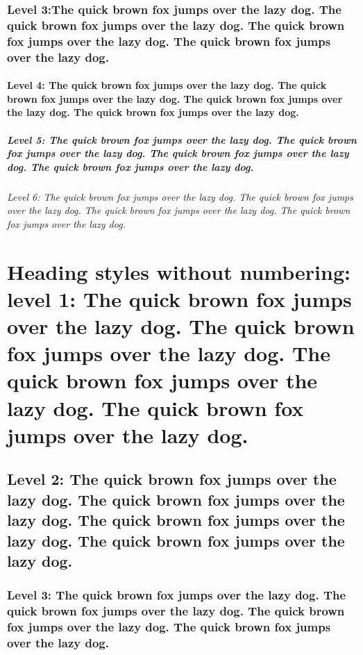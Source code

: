 \documentclass[9pt, twoside]{extreport}
\begin{document}
\lipsum[3-4]

\subsection{Level 3:The quick brown fox jumps over the lazy dog. The quick brown fox jumps over the lazy dog. The quick brown fox jumps over the lazy dog. The quick brown fox jumps over the lazy dog.}

\lipsum[5-6]

\subsubsection{Level 4: The quick brown fox jumps over the lazy dog. The quick brown fox jumps over the lazy dog. The quick brown fox jumps over the lazy dog. The quick brown fox jumps over the lazy dog.}

\lipsum[7-8]

\paragraph{Level 5: The quick brown fox jumps over the lazy dog. The quick brown fox jumps over the lazy dog. The quick brown fox jumps over the lazy dog. The quick brown fox jumps over the lazy dog.}

\lipsum[9-10]

\subparagraph{Level 6: The quick brown fox jumps over the lazy dog. The quick brown fox jumps over the lazy dog. The quick brown fox jumps over the lazy dog. The quick brown fox jumps over the lazy dog.}

\lipsum[11-12]



\chapter*{Heading styles without numbering: level 1: The quick brown fox jumps over the lazy dog. The quick brown fox jumps over the lazy dog. The quick brown fox jumps over the lazy dog. The quick brown fox jumps over the lazy dog.}
\section*{Level 2: The quick brown fox jumps over the lazy dog. The quick brown fox jumps over the lazy dog. The quick brown fox jumps over the lazy dog. The quick brown fox jumps over the lazy dog.}
\subsection*{Level 3: The quick brown fox jumps over the lazy dog. The quick brown fox jumps over the lazy dog. The quick brown fox jumps over the lazy dog. The quick brown fox jumps over the lazy dog.}
\end{document}
